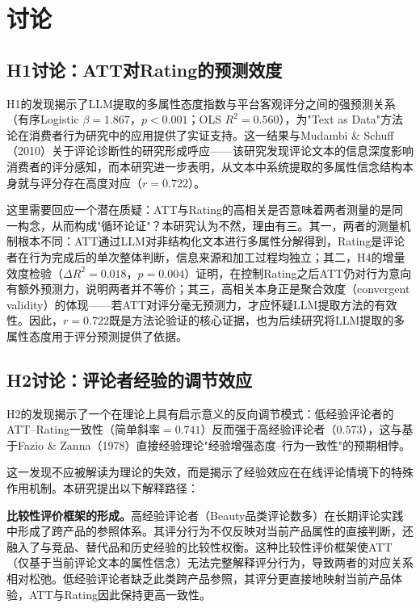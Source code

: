 \section{讨论}

\subsection{H1讨论：ATT对Rating的预测效度}

H1的发现揭示了LLM提取的多属性态度指数与平台客观评分之间的强预测关系（有序Logistic $\beta=1.867$，$p<0.001$；OLS $R^2=0.560$），为"Text as Data"方法论在消费者行为研究中的应用提供了实证支持。这一结果与Mudambi \& Schuff（2010）\cite{mudambi2010}关于评论诊断性的研究形成呼应——该研究发现评论文本的信息深度影响消费者的评分感知，而本研究进一步表明，从文本中系统提取的多属性信念结构本身就与评分存在高度对应（$r=0.722$）。

这里需要回应一个潜在质疑：ATT与Rating的高相关是否意味着两者测量的是同一构念，从而构成"循环论证"？本研究认为不然，理由有三。其一，两者的测量机制根本不同：ATT通过LLM对非结构化文本进行多属性分解得到，Rating是评论者在行为完成后的单次整体判断，信息来源和加工过程均独立；其二，H4的增量效度检验（$\Delta R^2=0.018$，$p=0.004$）证明，在控制Rating之后ATT仍对行为意向有额外预测力，说明两者并不等价；其三，高相关本身正是聚合效度（convergent validity）的体现——若ATT对评分毫无预测力，才应怀疑LLM提取方法的有效性。因此，$r=0.722$既是方法论验证的核心证据，也为后续研究将LLM提取的多属性态度用于评分预测提供了依据。

\subsection{H2讨论：评论者经验的调节效应}

H2的发现揭示了一个在理论上具有启示意义的反向调节模式：低经验评论者的ATT--Rating一致性（简单斜率$=0.741$）反而强于高经验评论者（$0.573$），这与基于Fazio \& Zanna（1978）\cite{fazio1978}直接经验理论"经验增强态度--行为一致性"的预期相悖。

这一发现不应被解读为理论的失效，而是揭示了经验效应在在线评论情境下的特殊作用机制。本研究提出以下解释路径：

\textbf{比较性评价框架的形成。}高经验评论者（Beauty品类评论数多）在长期评论实践中形成了跨产品的参照体系。其评分行为不仅反映对当前产品属性的直接判断，还融入了与竞品、替代品和历史经验的比较性权衡。这种比较性评价框架使ATT（仅基于当前评论文本的属性信念）无法完整解释评分行为，导致两者的对应关系相对松弛。低经验评论者缺乏此类跨产品参照，其评分更直接地映射当前产品体验，ATT与Rating因此保持更高一致性。


